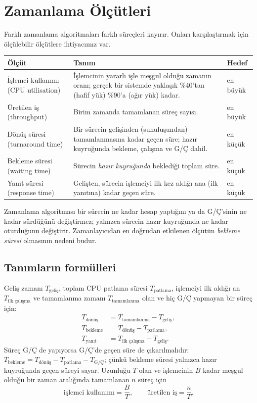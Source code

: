\section{Zamanlama Ölçütleri}

Farklı zamanlama algoritmaları farklı süreçleri kayırır. Onları karşılaştırmak için ölçülebilir ölçütlere ihtiyacımız var.

\begin{center}
\renewcommand{\arraystretch}{1.3}
\begin{tabularx}{\linewidth}{>{\raggedright\arraybackslash}p{3.3cm} X l}
\toprule
\textbf{Ölçüt} & \textbf{Tanım} & \textbf{Hedef} \\
\midrule
İşlemci kullanımı (CPU utilisation) & İşlemcinin yararlı işle meşgul olduğu zamanın oranı; gerçek bir sistemde yaklaşık \%40'tan (hafif yük) \%90'a (ağır yük) kadar. & en büyük \\
Üretilen iş (throughput) & Birim zamanda tamamlanan süreç sayısı. & en büyük \\
Dönüş süresi (turnaround time) & Bir sürecin gelişinden (sunuluşundan) tamamlanmasına kadar geçen süre; hazır kuyruğunda bekleme, çalışma ve G/Ç dahil. & en küçük \\
Bekleme süresi (waiting time) & Sürecin \emph{hazır kuyruğunda} beklediği toplam süre. & en küçük \\
Yanıt süresi (response time) & Gelişten, sürecin işlemciyi ilk kez aldığı ana (ilk yanıtına) kadar geçen süre. & en küçük \\
\bottomrule
\end{tabularx}
\end{center}

Zamanlama algoritması bir sürecin ne kadar hesap yaptığını ya da G/Ç'sinin ne kadar sürdüğünü değiştirmez; yalnızca sürecin hazır kuyruğunda ne kadar oturduğunu değiştirir. Zamanlayıcıdan en doğrudan etkilenen ölçütün \emph{bekleme süresi} olmasının nedeni budur.

\subsection{Tanımların formülleri}

Geliş zamanı $T_{\text{geliş}}$, toplam CPU patlama süresi $T_{\text{patlama}}$, işlemciyi ilk aldığı an $T_{\text{ilk çalışma}}$ ve tamamlanma zamanı $T_{\text{tamamlanma}}$ olan ve hiç G/Ç yapmayan bir süreç için:
\begin{align*}
T_{\text{dönüş}} &= T_{\text{tamamlanma}} - T_{\text{geliş}},\\
T_{\text{bekleme}} &= T_{\text{dönüş}} - T_{\text{patlama}},\\
T_{\text{yanıt}} &= T_{\text{ilk çalışma}} - T_{\text{geliş}}.
\end{align*}
Süreç G/Ç de yapıyorsa G/Ç'de geçen süre de çıkarılmalıdır: $T_{\text{bekleme}} = T_{\text{dönüş}} - T_{\text{patlama}} - T_{\text{G/Ç}}$; çünkü bekleme süresi yalnızca hazır kuyruğunda geçen süreyi sayar. Uzunluğu $T$ olan ve işlemcinin $B$ kadar meşgul olduğu bir zaman aralığında tamamlanan $n$ süreç için
\[
\text{işlemci kullanımı} = \frac{B}{T}, \qquad \text{üretilen iş} = \frac{n}{T}.
\]

